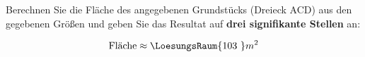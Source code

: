 

\begin{frage}[3]
 Berechnen Sie die Fläche des angegebenen Grundstücks (Dreieck ACD) aus den gegebenen Größen und geben Sie das Resultat auf \textbf{drei signifikante Stellen} an:
\begin{center}
\end{center}

$$\text{Fläche} \approx \LoesungsRaum{103\,\,}m^2$$
  
\end{frage}
